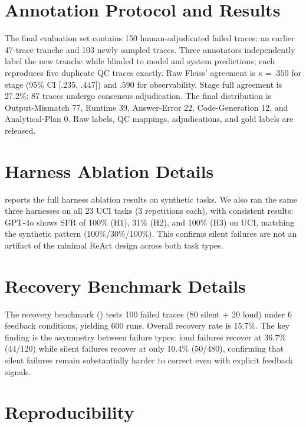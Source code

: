 \section{Annotation Protocol and Results}
\label{app:annotation}

The final evaluation set contains 150 human-adjudicated failed traces: an earlier 47-trace tranche and 103 newly sampled traces. Three annotators independently label the new tranche while blinded to model and system predictions; each reproduces five duplicate QC traces exactly. Raw Fleiss' agreement is $\kappa=.350$ for stage (95\% CI [.235, .447]) and $.590$ for observability. Stage full agreement is 27.2\%; 87 traces undergo consensus adjudication. The final distribution is Output-Mismatch 77, Runtime 39, Answer-Error 22, Code-Generation 12, and Analytical-Plan 0. Raw labels, QC mappings, adjudications, and gold labels are released.

\section{Harness Ablation Details}
\label{app:harness}

 reports the full harness ablation results on synthetic tasks. We also ran the same three harnesses on all 23 UCI tasks (3 repetitions each), with consistent results: GPT-4o shows SFR of 100\% (H1), 31\% (H2), and 100\% (H3) on UCI, matching the synthetic pattern (100\%/30\%/100\%). This confirms silent failures are not an artifact of the minimal ReAct design across both task types.



\section{Recovery Benchmark Details}
\label{app:recovery}

The recovery benchmark () tests 100 failed traces (80 silent + 20 loud) under 6 feedback conditions, yielding 600 runs. Overall recovery rate is 15.7\%. The key finding is the asymmetry between failure types: loud failures recover at 36.7\% (44/120) while silent failures recover at only 10.4\% (50/480), confirming that silent failures remain substantially harder to correct even with explicit feedback signals.

\section{Reproducibility}
\label{app:repro}


